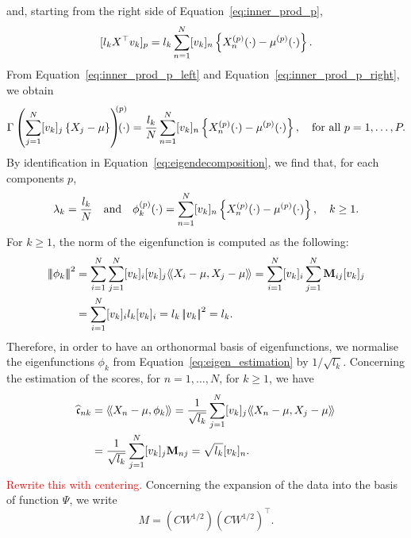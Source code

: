 and, starting from the right side of Equation~\eqref{eq:inner_prod_p},
\begin{equation}\label{eq:inner_prod_p_right}
    [l_k X^\top v_k]_p = l_k \sum_{n = 1}^N [v_{k}]_n \left\{X_n^{(p)}(\cdot) - \mu^{(p)}(\cdot)\right\}.
\end{equation}
From Equation~\eqref{eq:inner_prod_p_left} and Equation~\eqref{eq:inner_prod_p_right}, we obtain
\begin{equation}
    \Gamma\left(\sum_{j = 1}^N [v_{k}]_j \left\{X_j - \mu\right\}\right)^{\mkern-9mu(p)}\mkern-18mu(\cdot) = \frac{l_k}{N} \sum_{n = 1}^N [v_{k}]_n \left\{X_n^{(p)}(\cdot) - \mu^{(p)}(\cdot)\right\}, \quad\text{for all}~ p = 1, \dots, P.
\end{equation}
By identification in Equation~\eqref{eq:eigendecomposition}, we find that, for each components $p$,
\begin{equation}\label{eq:eigen_estimation}
\lambda_k = \frac{l_k}{N} \quad\text{and}\quad \phi_k^{(p)}(\cdot) = \sum_{n = 1}^N [v_{k}]_n \left\{X_n^{(p)}(\cdot) - \mu^{(p)}(\cdot)\right\}, \quad k \geq 1.
\end{equation}
For $k \geq 1$, the norm of the eigenfunction is computed as the following:
\begin{align*}
\normH{\phi_k}^2 &= \sum_{i = 1}^N \sum_{j = 1}^N [v_{k}]_i [v_{k}]_j\inH{X_i - \mu}{X_j - \mu} = \sum_{i = 1}^N [v_{k}]_i \sum_{j = 1}^N \mathbf{M}_{ij} [v_{k}]_j \\
    &= \sum_{i = 1}^N [v_{k}]_i l_k [v_{k}]_i = l_k \normLp{v_k}^2 = l_k. \\
\end{align*}
Therefore, in order to have an orthonormal basis of eigenfunctions, we normalise the eigenfunctions $\phi_k$ from Equation~\eqref{eq:eigen_estimation} by $1 / \sqrt{l_k}$.
Concerning the estimation of the scores, for $n = 1, \dots, N$, for $k \geq 1$, we have
\begin{align}
    \widehat{\mathfrak{c}}_{nk} &= \langle\!\langle X_n - \mu, \phi_k\rangle\!\rangle = \frac{1}{\sqrt{l_k}}\sum_{j = 1}^N [v_{k}]_j \langle\!\langle X_n - \mu, X_j - \mu\rangle\!\rangle\\
    &= \frac{1}{\sqrt{l_k}}\sum_{j = 1}^N [v_{k}]_j \mathbf{M}_{nj} = \sqrt{l_k}[v_{k}]_n.\\
\end{align}
\textcolor{red}{Rewrite this with centering.}
Concerning the expansion of the data into the basis of function $\Psi$, we write 
\begin{equation}
    M = \left(CW^{1/2}\right)\left(CW^{1/2}\right)^\top.
\end{equation}
